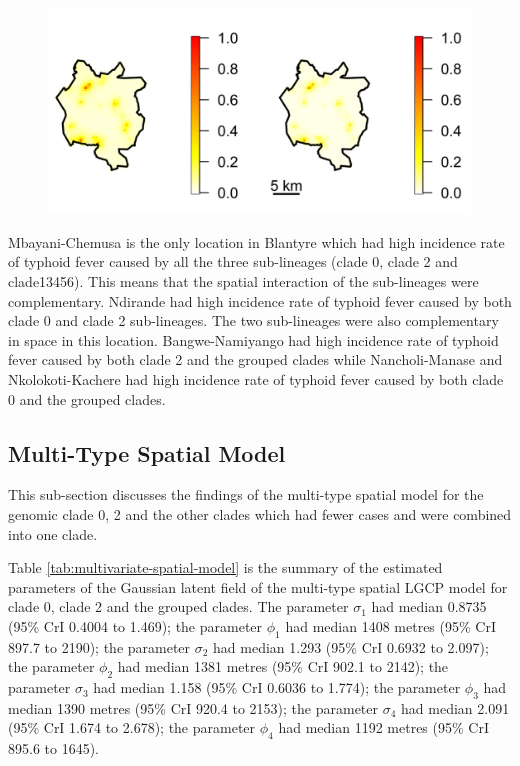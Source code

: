 \begin{figure}[H]
    \begin{center}
        \includegraphics[scale=0.8]{Exceedance Probabilities - Major 13456.png}
    \end{center}
    \label{fig:exceedance-plot-posterior-probability}
\end{figure}

Mbayani-Chemusa is the only location in Blantyre which had high incidence rate of typhoid fever caused by all the three sub-lineages (clade 0, clade 2 and clade13456). This means that the spatial interaction of the sub-lineages were complementary. Ndirande had high incidence rate of typhoid fever caused by both clade 0 and clade 2 sub-lineages. The two sub-lineages were also complementary in space in this location. Bangwe-Namiyango had high incidence rate of typhoid fever caused by both clade 2 and the grouped clades while Nancholi-Manase and Nkolokoti-Kachere had high incidence rate of typhoid fever caused by both clade 0 and the grouped clades.

\subsection{Multi-Type Spatial Model}

This sub-section discusses the findings of the multi-type spatial model for the genomic clade 0, 2 and the other clades which had fewer cases and were combined into one clade.

Table \ref{tab:multivariate-spatial-model} is the summary of the estimated parameters of the Gaussian latent field of the multi-type spatial LGCP model for clade 0, clade 2 and the grouped clades. The parameter $\sigma_1$ had median 0.8735 (95\% CrI 0.4004 to 1.469); the parameter $\phi_1$ had median 1408 metres (95\% CrI 897.7 to 2190); the parameter $\sigma_2$ had median 1.293 (95\% CrI 0.6932 to 2.097); the parameter $\phi_2$ had median 1381 metres (95\% CrI 902.1 to 2142); the parameter $\sigma_3$ had median 1.158 (95\% CrI 0.6036 to 1.774); the parameter $\phi_3$ had median 1390 metres (95\% CrI 920.4 to 2153); the parameter $\sigma_4$ had median 2.091 (95\% CrI 1.674 to 2.678); the parameter $\phi_4$ had median 1192 metres (95\% CrI 895.6 to 1645).


